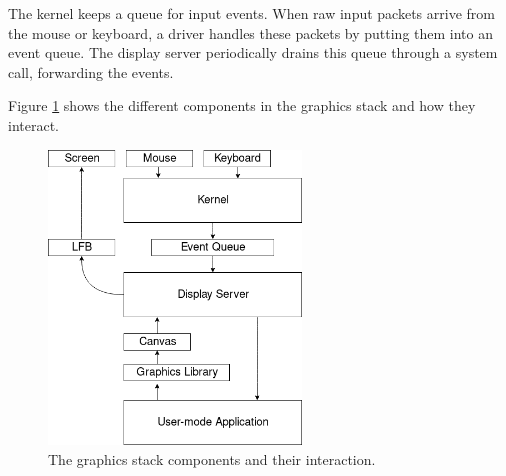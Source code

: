 \documentclass{report}
\begin{document}
The kernel keeps a queue for input events. When raw input packets arrive from
the mouse or keyboard, a driver handles these packets by putting them into an
event queue. The display server periodically drains this queue through a
system call, forwarding the events.

Figure \ref{graphicslayout} shows the different components in the graphics
stack and how they interact. 
\begin{figure}[h]
\centering
\includegraphics[width=0.6\textwidth]{flow-diagram2.png}
\caption{The graphics stack components and their interaction.}
\label{graphicslayout}
\end{figure}
\end{document}
